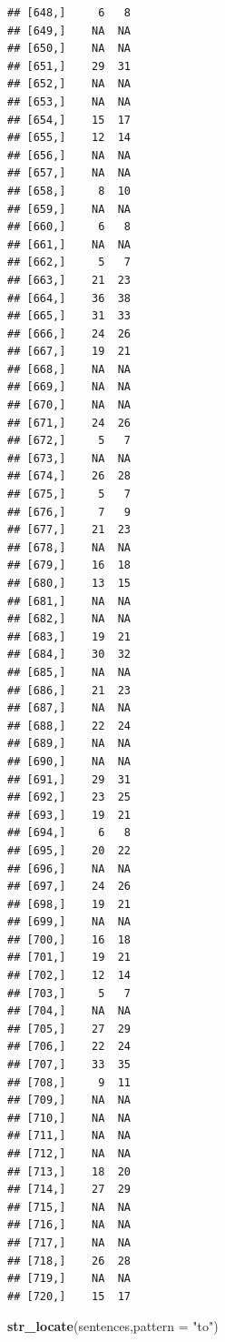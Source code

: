 \documentclass[
]{article}
\newenvironment{Shaded}{\begin{snugshade}}{\end{snugshade}}
\newcommand{\AttributeTok}[1]{\textcolor[rgb]{0.13,0.29,0.53}{#1}}
\newcommand{\FunctionTok}[1]{\textcolor[rgb]{0.13,0.29,0.53}{\textbf{#1}}}
\newcommand{\NormalTok}[1]{#1}
\newcommand{\StringTok}[1]{\textcolor[rgb]{0.31,0.60,0.02}{#1}}
\begin{document}
\begin{verbatim}
## [648,]     6   8
## [649,]    NA  NA
## [650,]    NA  NA
## [651,]    29  31
## [652,]    NA  NA
## [653,]    NA  NA
## [654,]    15  17
## [655,]    12  14
## [656,]    NA  NA
## [657,]    NA  NA
## [658,]     8  10
## [659,]    NA  NA
## [660,]     6   8
## [661,]    NA  NA
## [662,]     5   7
## [663,]    21  23
## [664,]    36  38
## [665,]    31  33
## [666,]    24  26
## [667,]    19  21
## [668,]    NA  NA
## [669,]    NA  NA
## [670,]    NA  NA
## [671,]    24  26
## [672,]     5   7
## [673,]    NA  NA
## [674,]    26  28
## [675,]     5   7
## [676,]     7   9
## [677,]    21  23
## [678,]    NA  NA
## [679,]    16  18
## [680,]    13  15
## [681,]    NA  NA
## [682,]    NA  NA
## [683,]    19  21
## [684,]    30  32
## [685,]    NA  NA
## [686,]    21  23
## [687,]    NA  NA
## [688,]    22  24
## [689,]    NA  NA
## [690,]    NA  NA
## [691,]    29  31
## [692,]    23  25
## [693,]    19  21
## [694,]     6   8
## [695,]    20  22
## [696,]    NA  NA
## [697,]    24  26
## [698,]    19  21
## [699,]    NA  NA
## [700,]    16  18
## [701,]    19  21
## [702,]    12  14
## [703,]     5   7
## [704,]    NA  NA
## [705,]    27  29
## [706,]    22  24
## [707,]    33  35
## [708,]     9  11
## [709,]    NA  NA
## [710,]    NA  NA
## [711,]    NA  NA
## [712,]    NA  NA
## [713,]    18  20
## [714,]    27  29
## [715,]    NA  NA
## [716,]    NA  NA
## [717,]    NA  NA
## [718,]    26  28
## [719,]    NA  NA
## [720,]    15  17
\end{verbatim}

\begin{Shaded}
\begin{Highlighting}[]
\FunctionTok{str\_locate}\NormalTok{(sentences,}\AttributeTok{pattern =} \StringTok{"to"}\NormalTok{)}
\end{Highlighting}
\end{Shaded}
\end{document}
